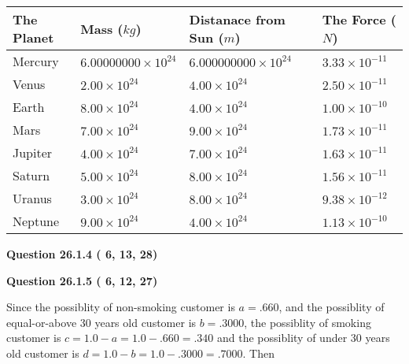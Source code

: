 \documentclass[12pt]{article}
\begin{document}
 
\begin{tabular}{|l|l|l|l|}
\hline
The Planet & Mass ($kg$) & Distanace from Sun ($m$) & The Force ($N$)\\
\hline
Mercury  &
           $ %
6.00000000 \times 10^{24} $   &
             $ %
6.000000000 \times 10^{24} $    & $ %
3.33 \times 10^{-11} $
\\  \hline
Venus    &
           $  %
2.00 \times 10^{24}  $     &
             $ %
4.00 \times 10^{24} $    & $ %
2.50 \times 10^{-11} $
\\  \hline
Earth    &
           $  %
8.00 \times 10^{24}  $     &
             $ %
4.00 \times 10^{24} $    & $ %
1.00 \times 10^{-10} $
\\   \hline
Mars     &
           $  %
7.00 \times 10^{24} $     &
             $ %
9.00 \times 10^{24} $    & $ %
1.73 \times 10^{-11} $
\\   \hline
Jupiter  &
           $  %
4.00 \times 10^{24} $    &
             $ %
7.00 \times 10^{24} $    & $ %
1.63 \times 10^{-11} $
\\  \hline
Saturn   &
           $  %
5.00 \times 10^{24} $    &
             $ %
8.00 \times 10^{24}  $    & $ %
1.56 \times 10^{-11} $
\\  \hline
Uranus   &
           $  %
3.00 \times 10^{24} $    &
             $ %
8.00 \times 10^{24} $    & $ %
9.38 \times 10^{-12} $
\\  \hline
Neptune  &
           $  %
9.00 \times 10^{24} $    &
             $ %
4.00 \times 10^{24} $    & $ %
1.13 \times 10^{-10} $
\\  \hline
 
\end{tabular}
 
 
 
 
  
\vspace{0.2in}
  
{\textbf{\Large{Question
26.1.4 
 (          6,         13,         28)
}}}
  
  
  
\vspace{0.2in}
  
{\textbf{\Large{Question
26.1.5 
 (          6,         12,         27)
}}}
  
  
 
 

Since the possiblity of  %
 non-smoking customer is $ a =  %
.660 $,
and the possiblity of  %
equal-or-above 30 years old customer is $ b =  %
.3000 $,
the possiblity of  %
smoking customer is $ c = 1.0 - a = 1.0 -
.660
=  %
.340 $ and the possiblity of  %
under 30 years old
customer is $ d = 1.0 - b = 1.0 -  %
.3000 =  %
.7000  $.
Then
 
\end{document}
